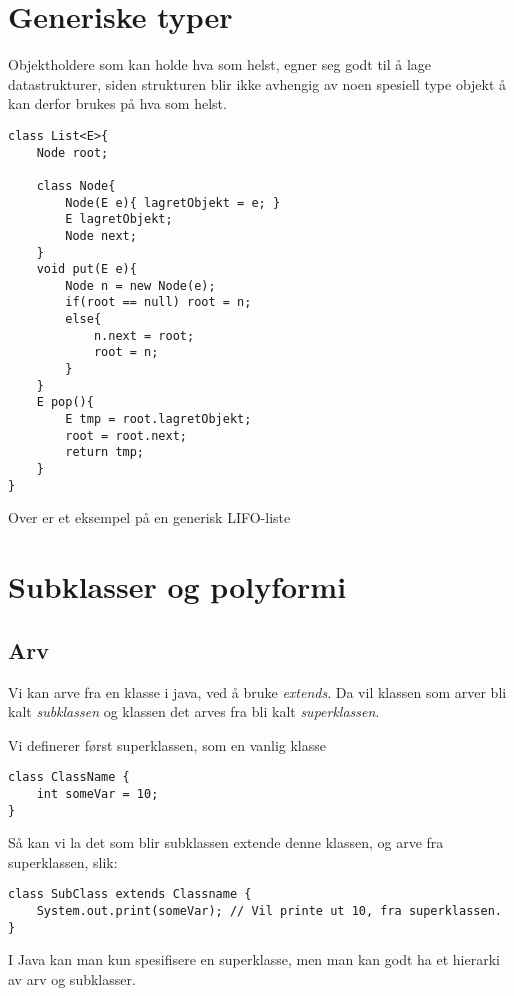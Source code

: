 \documentclass[11pt]{article}
\begin{document}
\section{Generiske typer}
\label{sec-14}

Objektholdere som kan holde hva som helst, egner seg godt til å lage datastrukturer, siden strukturen blir ikke avhengig av noen spesiell type objekt å
kan derfor brukes på hva som helst. 

\begin{verbatim}
class List<E>{
    Node root;
    
    class Node{
        Node(E e){ lagretObjekt = e; } 
        E lagretObjekt;
        Node next;
    }    
    void put(E e){
        Node n = new Node(e);
        if(root == null) root = n;
        else{ 
            n.next = root; 
            root = n;
        }
    }    
    E pop(){
        E tmp = root.lagretObjekt;
        root = root.next;
        return tmp;
    }
}
\end{verbatim}

Over er et eksempel på en generisk LIFO-liste
\section{Subklasser og polyformi}
\label{sec-15}
\subsection{Arv}
\label{sec-15_1}

Vi kan arve fra en klasse i java, ved å bruke \emph{extends}. Da vil
klassen som arver bli kalt \emph{subklassen} og klassen det arves fra bli
kalt \emph{superklassen}.

Vi definerer først superklassen, som en vanlig klasse

\begin{verbatim}
class ClassName {
    int someVar = 10;
}
\end{verbatim}

Så kan vi la det som blir subklassen extende denne klassen, og arve
fra superklassen, slik:

\begin{verbatim}
class SubClass extends Classname {
    System.out.print(someVar); // Vil printe ut 10, fra superklassen.
}
\end{verbatim}

I Java kan man kun spesifisere en superklasse, men man kan godt ha et
hierarki av arv og subklasser.
\end{document}
